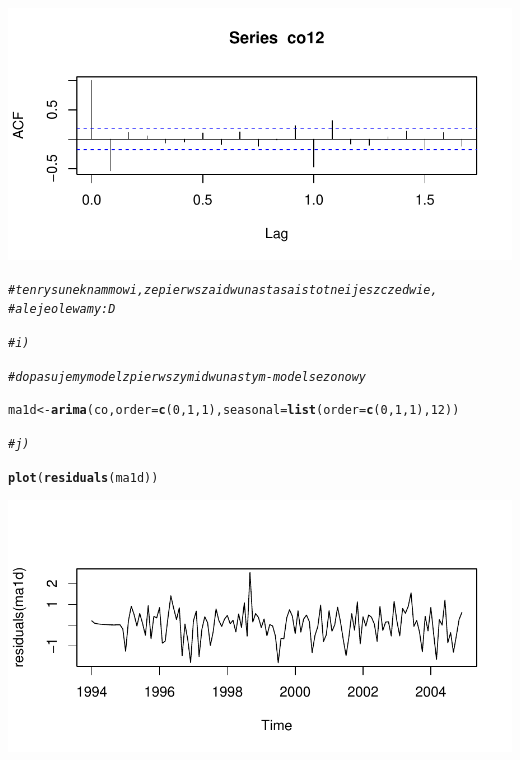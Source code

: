 \documentclass[10pt,a4paper,noindentfirst]{article}\usepackage[]{graphicx}\usepackage[]{color}
\makeatletter
\def\maxwidth{ %
  \ifdim\Gin@nat@width>\linewidth
    \linewidth
  \else
    \Gin@nat@width
  \fi
}
\newcommand{\hlnum}[1]{\textcolor[rgb]{0.686,0.059,0.569}{#1}}%
\newcommand{\hlcom}[1]{\textcolor[rgb]{0.678,0.584,0.686}{\textit{#1}}}%
\newcommand{\hlstd}[1]{\textcolor[rgb]{0.345,0.345,0.345}{#1}}%
\newcommand{\hlkwb}[1]{\textcolor[rgb]{0.69,0.353,0.396}{#1}}%
\newcommand{\hlkwc}[1]{\textcolor[rgb]{0.333,0.667,0.333}{#1}}%
\newcommand{\hlkwd}[1]{\textcolor[rgb]{0.737,0.353,0.396}{\textbf{#1}}}%
\newenvironment{kframe}{%
 \def\at@end@of@kframe{}%
 \ifinner\ifhmode%
  \def\at@end@of@kframe{\end{minipage}}%
  \begin{minipage}{\columnwidth}%
 \fi\fi%
 \def\FrameCommand##1{\hskip\@totalleftmargin \hskip-\fboxsep
 \colorbox{shadecolor}{##1}\hskip-\fboxsep
     \hskip-\linewidth \hskip-\@totalleftmargin \hskip\columnwidth}%
 \MakeFramed {\advance\hsize-\width
   \@totalleftmargin\z@ \linewidth\hsize
   \@setminipage}}%
 {\par\unskip\endMakeFramed%
 \at@end@of@kframe}
\newenvironment{knitrout}{}{} %
\makeatother
\begin{document}
\begin{knitrout}
{\centering \includegraphics[width=\maxwidth]{figure/unnamed-chunk-18} 

}


\begin{kframe}\begin{alltt}
\hlcom{# ten rysunek nam mowi, ze pierwsza i dwunasta sa istotne i jeszcze dwie, }
\hlcom{# ale je olewamy :D}

\hlcom{# i)}

\hlcom{# dopasujemy model z pierwszym i dwunastym - model sezonowy}

\hlstd{ma1d} \hlkwb{<-} \hlkwd{arima}\hlstd{(co,}\hlkwc{order}\hlstd{=}\hlkwd{c}\hlstd{(}\hlnum{0}\hlstd{,}\hlnum{1}\hlstd{,}\hlnum{1}\hlstd{),}\hlkwc{seasonal}\hlstd{=}\hlkwd{list}\hlstd{(}\hlkwc{order}\hlstd{=}\hlkwd{c}\hlstd{(}\hlnum{0}\hlstd{,}\hlnum{1}\hlstd{,}\hlnum{1}\hlstd{),}\hlnum{12}\hlstd{))}

\hlcom{# j)}

\hlkwd{plot}\hlstd{(}\hlkwd{residuals}\hlstd{(ma1d))}
\end{alltt}
\end{kframe}

{\centering \includegraphics[width=\maxwidth]{figure/unnamed-chunk-19} 

}



\end{knitrout}
\end{document}
